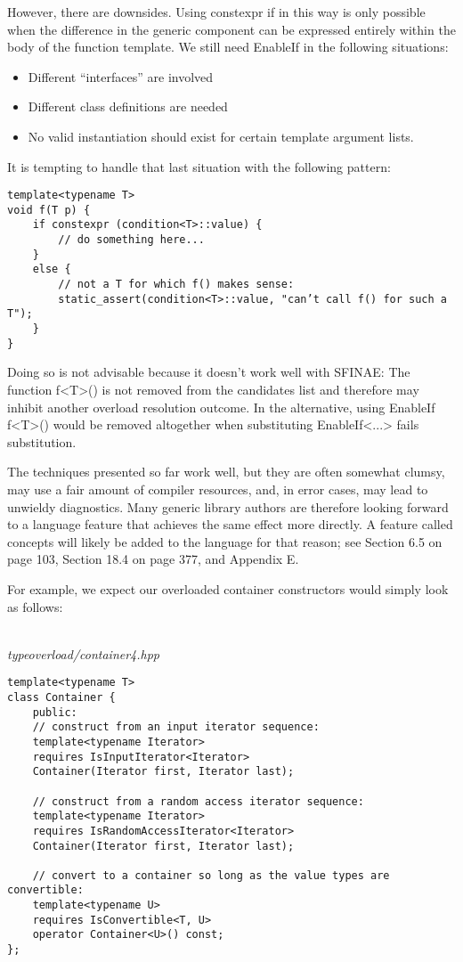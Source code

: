 However, there are downsides. Using constexpr if in this way is only possible when the difference in the generic component can be expressed entirely within the body of the function template. We still need EnableIf in the following situations:

\begin{itemize}
\item
Different “interfaces” are involved

\item
Different class definitions are needed

\item
No valid instantiation should exist for certain template argument lists.
\end{itemize}

It is tempting to handle that last situation with the following pattern:

\begin{lstlisting}[style=styleCXX]
template<typename T>
void f(T p) {
	if constexpr (condition<T>::value) {
		// do something here...
	}
	else {
		// not a T for which f() makes sense:
		static_assert(condition<T>::value, "can’t call f() for such a T");
	}
}
\end{lstlisting}

Doing so is not advisable because it doesn’t work well with SFINAE: The function f<T>() is not removed from the candidates list and therefore may inhibit another overload resolution outcome. In the alternative, using EnableIf f<T>() would be removed altogether when substituting EnableIf<...> fails substitution.


The techniques presented so far work well, but they are often somewhat clumsy, may use a fair amount of compiler resources, and, in error cases, may lead to unwieldy diagnostics. Many generic library authors are therefore looking forward to a language feature that achieves the same effect more directly. A feature called concepts will likely be added to the language for that reason; see Section 6.5 on page 103, Section 18.4 on page 377, and Appendix E.

For example, we expect our overloaded container constructors would simply look as follows:

\hspace*{\fill} \\ %
\noindent
\textit{typeoverload/container4.hpp}
\begin{lstlisting}[style=styleCXX]
template<typename T>
class Container {
	public:
	// construct from an input iterator sequence:
	template<typename Iterator>
	requires IsInputIterator<Iterator>
	Container(Iterator first, Iterator last);
	
	// construct from a random access iterator sequence:
	template<typename Iterator>
	requires IsRandomAccessIterator<Iterator>
	Container(Iterator first, Iterator last);
	
	// convert to a container so long as the value types are convertible:
	template<typename U>
	requires IsConvertible<T, U>
	operator Container<U>() const;
};
\end{lstlisting}

